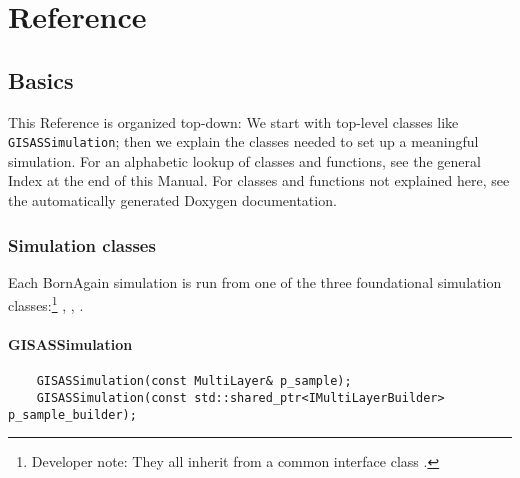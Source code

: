 
\part{Reference}\label{PREF}
\chapter{Basics}\label{SRefBas}

This Reference is organized top-down: We start with top-level classes like
\texttt{GISAS\-Simulation};
then we explain the classes needed to set up a meaningful simulation.
For an alphabetic lookup of classes and functions,
see the general Index at the end of this Manual.
For classes and functions not explained here,
see the automatically generated Doxygen documentation.

\section{Simulation classes}\label{SRefSim}

Each BornAgain simulation is run from one of the three
foundational simulation classes:\footnote
{Developer note: They all inherit from a common interface class .}
,
,
.

\subsection{GISASSimulation}

\setCpp
\begin{lstlisting}
    GISASSimulation(const MultiLayer& p_sample);
    GISASSimulation(const std::shared_ptr<IMultiLayerBuilder> p_sample_builder);
\end{lstlisting}
